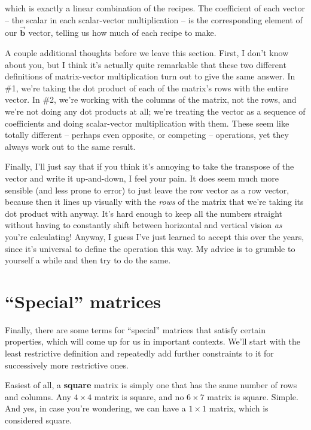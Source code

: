 which is exactly a linear combination of the recipes. The coefficient of each
vector -- the scalar in each scalar-vector multiplication -- is the
corresponding element of our $\overrightarrow{\textbf{b}}$ vector, telling us
how much of each recipe to make.

\bigskip

A couple additional thoughts before we leave this section. First, I don't know
about you, but I think it's actually quite remarkable that these two different
definitions of matrix-vector multiplication turn out to give the same answer.
In \#1, we're taking the dot product of each of the matrix's rows with the
entire vector. In \#2, we're working with the columns of the matrix, not the
rows, and we're not doing any dot products at all; we're treating the vector as
a sequence of coefficients and doing scalar-vector multiplication with them.
These seem like totally different -- perhaps even opposite, or competing --
operations, yet they always work out to the same result.

Finally, I'll just say that if you think it's annoying to take the transpose of
the vector and write it up-and-down, I feel your pain. It does seem much more
sensible (and less prone to error) to just leave the row vector as a row
vector, because then it lines up visually with the \textit{rows} of the matrix
that we're taking its dot product with anyway. It's hard enough to keep all the
numbers straight without having to constantly shift between horizontal and
vertical vision \textit{as} you're calculating! Anyway, I guess I've just
learned to accept this over the years, since it's universal to define the
operation this way. My advice is to grumble to yourself a while and then try to
do the same.

\section{``Special'' matrices}

Finally, there are some terms for ``special'' matrices that satisfy certain
properties, which will come up for us in important contexts. We'll start with
the least restrictive definition and repeatedly add further constraints to it
for successively more restrictive ones.

Easiest of all, a \textbf{square} matrix is simply one that has the same number
of rows and columns. Any $4\times 4$ matrix is square, and no $6\times 7$
matrix is square. Simple. And yes, in case you're wondering, we can have a
$1\times 1$ matrix, which is considered square.

